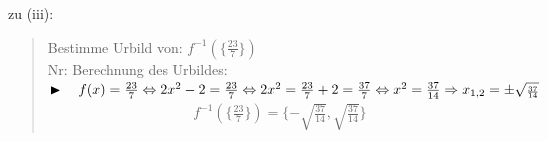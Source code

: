 zu (iii):\\
\begin{quote}
	Bestimme Urbild von: $f^{-1}(\{\frac{23}{7}\})$\vspace*{2mm}\\
	Nr: Berechnung des Urbildes:\\
	$\blacktriangleright\quad f(x)=\frac{23}{7}	\Leftrightarrow 2x^2-2=\frac{23}{7}\Leftrightarrow 2x^2=\frac{23}{7}+2=\frac{37}{7}\Leftrightarrow x^2=\frac{37}{14}\Rightarrow x_{1,2}=\pm \sqrt{\smash[b]{\scriptscriptstyle\frac{37}{14}}}$\\
	\begin{align*}
		f^{-1}(\{\tfrac{23}{7}\})=\{ -\sqrt{\scriptscriptstyle\frac{37}{14}},\sqrt{\scriptscriptstyle\frac{37}{14}}\}
	\end{align*}
\end{quote}
